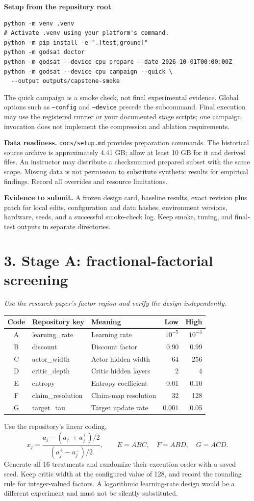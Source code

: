 \documentclass[11pt,letterpaper]{article}
\newcommand{\pageheading}[2]{\section*{\color{navy}#1}\textit{#2}\par}
\newcommand{\code}[1]{\texttt{\small #1}}
\newcommand{\deliver}[1]{\medskip\textbf{Evidence to submit.} #1}
\begin{document}
\textbf{Setup from the repository root}
\begin{verbatim}
python -m venv .venv
# Activate .venv using your platform's command.
python -m pip install -e ".[test,ground]"
python -m godsat doctor
python -m godsat --device cpu prepare --date 2026-10-01T00:00:00Z
python -m godsat --device cpu campaign --quick \
  --output outputs/capstone-smoke
\end{verbatim}
The quick campaign is a smoke check, not final experimental evidence. Global options such as \code{--config} and \code{--device} precede the subcommand. Final execution may use the registered runner or your documented stage scripts; one campaign invocation does not implement the compression and ablation requirements.

\textbf{Data readiness.} \code{docs/setup.md} provides preparation commands. The historical source archive is approximately 4.41 GB; allow at least 10 GB for it and derived files. An instructor may distribute a checksummed prepared subset with the same scope. Missing data is not permission to substitute synthetic results for empirical findings. Record all overrides and resource limitations.

\deliver{A frozen design card, baseline results, exact revision plus patch for local edits, configuration and data hashes, environment versions, hardware, seeds, and a successful smoke-check log. Keep smoke, tuning, and final-test outputs in separate directories.}

\newpage
\pageheading{3. Stage A: fractional-factorial screening}{Use the research paper's factor region and verify the design independently.}
\begin{center}\small
\begin{tabularx}{\linewidth}{clXrr}
\toprule
Code & Repository key & Meaning & Low & High\\\midrule
A & learning\_rate & Learning rate & $10^{-5}$ & $10^{-3}$\\
B & discount & Discount factor & 0.90 & 0.99\\
C & actor\_width & Actor hidden width & 64 & 256\\
D & critic\_depth & Critic hidden layers & 2 & 4\\
E & entropy & Entropy coefficient & 0.01 & 0.10\\
F & claim\_resolution & Claim-map resolution & 32 & 128\\
G & target\_tau & Target update rate & 0.001 & 0.05\\\bottomrule
\end{tabularx}
\end{center}
Use the repository's linear coding,
\[
x_j=\frac{a_j-(a_j^-+a_j^+)/2}{(a_j^+-a_j^-)/2},
\qquad E=ABC,\quad F=ABD,\quad G=ACD.
\]
Generate all 16 treatments and randomize their execution order with a saved seed. Keep critic width at the configured value of 128, and record the rounding rule for integer-valued factors. A logarithmic learning-rate design would be a different experiment and must not be silently substituted.
\end{document}
